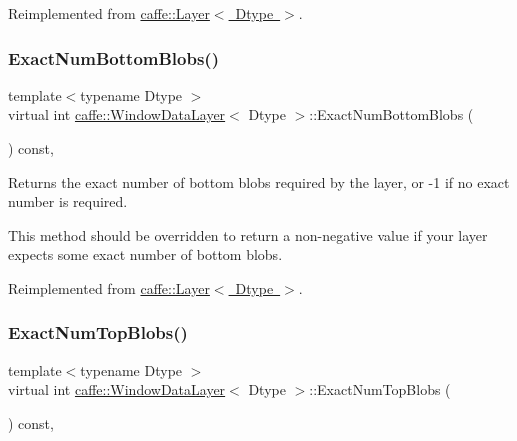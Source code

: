 Reimplemented from \mbox{\hyperlink{classcaffe_1_1_layer_a8e5ee0494d85f5f55fc4396537cbc60f}{caffe\+::\+Layer$<$ Dtype $>$}}.

\mbox{\label{classcaffe_1_1_window_data_layer_ac982c8170a7f899366321412a7bb91d7}} 
\subsubsection{\texorpdfstring{Exact\+Num\+Bottom\+Blobs()}{ExactNumBottomBlobs()}\hspace{0.1cm}{\footnotesize\ttfamily [2/2]}}
{\footnotesize\ttfamily template$<$typename Dtype $>$ \\
virtual int \mbox{\hyperlink{classcaffe_1_1_window_data_layer}{caffe\+::\+Window\+Data\+Layer}}$<$ Dtype $>$\+::Exact\+Num\+Bottom\+Blobs (\begin{DoxyParamCaption}{ }\end{DoxyParamCaption}) const\hspace{0.3cm}{\ttfamily [inline]}, {\ttfamily [virtual]}}



Returns the exact number of bottom blobs required by the layer, or -\/1 if no exact number is required. 

This method should be overridden to return a non-\/negative value if your layer expects some exact number of bottom blobs. 

Reimplemented from \mbox{\hyperlink{classcaffe_1_1_layer_a8e5ee0494d85f5f55fc4396537cbc60f}{caffe\+::\+Layer$<$ Dtype $>$}}.

\mbox{\label{classcaffe_1_1_window_data_layer_a7bd9264758f462b3392d2eedec8b1c99}} 
\subsubsection{\texorpdfstring{Exact\+Num\+Top\+Blobs()}{ExactNumTopBlobs()}\hspace{0.1cm}{\footnotesize\ttfamily [1/2]}}
{\footnotesize\ttfamily template$<$typename Dtype $>$ \\
virtual int \mbox{\hyperlink{classcaffe_1_1_window_data_layer}{caffe\+::\+Window\+Data\+Layer}}$<$ Dtype $>$\+::Exact\+Num\+Top\+Blobs (\begin{DoxyParamCaption}{ }\end{DoxyParamCaption}) const\hspace{0.3cm}{\ttfamily [inline]}, {\ttfamily [virtual]}}




